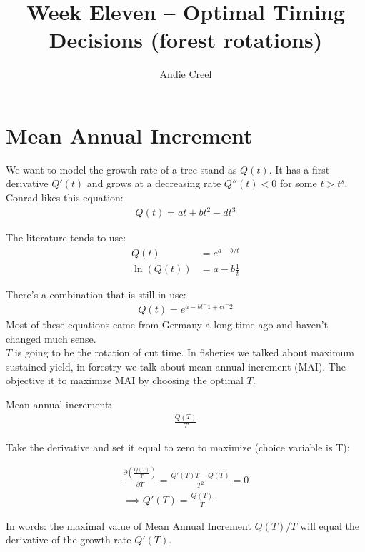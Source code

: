 \documentclass[12pt]{article}
\title{Week Eleven -- Optimal Timing Decisions (forest rotations)}
\author{Andie Creel}
\begin{document}
\maketitle

\section{Mean Annual Increment}

We want to model the growth rate of a tree stand as $Q(t)$. It has a first derivative $Q'(t)$ and grows at a decreasing rate $Q''(t) <0$ for some $t > t^s$. \\

Conrad likes this equation:
\begin{align}
    Q(t) = at + bt^2 - d t^3
\end{align}

The literature tends to use:
\begin{align}
    Q(t) &= e^{a-b/t} \\
    \ln(Q(t)) &= a - b \frac{1}{t}
\end{align}

There's a combination that is still in use:
\begin{align}
    Q(t) = e^{a - bt^-1 + ct^-2}
\end{align}
Most of these equations came from Germany a long time ago and haven't changed much sense. \\

$T$ is going to be the rotation of cut time. In fisheries we talked about maximum sustained yield, in forestry we talk about mean annual increment (MAI). The objective it to maximize MAI by choosing the optimal $T$. 

Mean annual increment: 
\begin{align}
    \frac{Q(T)}{T}
\end{align}

Take the derivative and set it equal to zero to maximize (choice variable is T):

\begin{align}
    \frac{\partial (\frac{Q(T)}{T})}{\partial T} = \frac{Q'(T) T - Q(T)}{T^2} = 0\\
    \implies Q'(T) = \frac{Q(T)}{T}
\end{align}

In words: the maximal value of Mean Annual Increment $Q(T)/T$ will equal the derivative of the growth rate $Q'(T)$. \\
\end{document}
